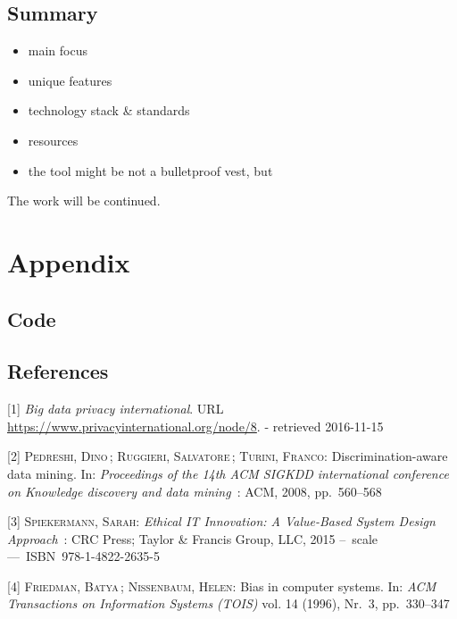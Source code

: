 \documentclass[12pt,english,a4paper,titlepage,cleardoublepage=empty,dottedtoc]{report}
\providecommand{\tightlist}{%
  \setlength{\itemsep}{0pt}\setlength{\parskip}{0pt}}
\begin{document}
\section{Summary}\label{summary}

\begin{itemize}
\tightlist
\item
  main focus
\item
  unique features
\item
  technology stack \& standards
\item
  resources
\item
  the tool might be not a bulletproof vest, but
\end{itemize}

The work will be continued.

\chapter*{Appendix}\label{appendix}

\section*{Code}\label{code}

\section*{References}\label{references}

\hypertarget{refs}{}
\hypertarget{ref-web_2016_privacy-international-about-big-data}{}
{[}1{]} \emph{Big data privacy international}. URL
\url{https://www.privacyinternational.org/node/8}. - retrieved
2016-11-15

\hypertarget{ref-paper_2008_discrimination-aware-data-mining}{}
{[}2{]} \textsc{Pedreshi, Dino}\,; \textsc{Ruggieri, Salvatore}\,;
\textsc{Turini, Franco}: Discrimination-aware data mining. In:
\emph{Proceedings of the 14th ACM SIGKDD international conference on
Knowledge discovery and data mining}~: ACM, 2008, pp.~560--568

\hypertarget{ref-book_2015_ethical-it-innovation_ethical-uses-of-information-and-knowledge}{}
{[}3{]} \textsc{Spiekermann, Sarah}: \emph{Ethical IT Innovation: A
Value-Based System Design Approach}~: CRC Press; Taylor \& Francis
Group, LLC, 2015 --~scale ---~ISBN~978-1-4822-2635-5

\hypertarget{ref-paper_1996_bias-in-computer-systems}{}
{[}4{]} \textsc{Friedman, Batya}\,; \textsc{Nissenbaum, Helen}: Bias in
computer systems. In: \emph{ACM Transactions on Information Systems
(TOIS)} vol. 14 (1996), Nr.~3, pp.~330--347
\end{document}
